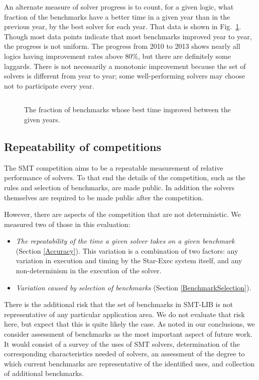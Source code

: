 \documentclass[smallcondensed]{svjour3}
\begin{document}
An alternate measure of solver progress is to count, for a given logic, what fraction of the benchmarks have a better time in a given year than in the previous year, by the best solver for each year. That data is shown in Fig.~\ref{Fig:bettertime}. Though most data points indicate that most benchmarks improved year to year, the progress is not uniform. The progress from 2010 to 2013 shows nearly all logics having improvement rates above 80\%, but there are definitely some laggards. There is not necessarily a monotonic improvement because the set of solvers is different from year to year; some well-performing solvers may choose not to participate every year.

\begin{figure}
\centering
\begin{tabular}{|l|r|rrrr|}
\hline

\hline
\end{tabular}
\caption{The fraction of benchmarks whose best time improved between the given years.}
\label{Fig:bettertime}
\end{figure}


\subsection{Repeatability of competitions}
\label{CompetitionRepeatability}

The SMT competition aims to be a repeatable measurement of relative performance of solvers. To that end the details of the competition, such as the rules and selection of benchmarks, are made public. In addition the solvers themselves are required to be made public after the competition.

However, there are aspects of the competition that are not deterministic. We measured two of those in this evaluation:
\begin{itemize}[noitemsep,nolistsep]
\item {\em The repeatability of the time a given solver takes on a given benchmark} (Section \ref{Accuracy}). This variation is a combination of two factors: any variation in execution and timing by the Star-Exec system itself, and any non-determinism in the execution of the solver.
\item {\em Variation caused by selection of benchmarks} (Section \ref{BenchmarkSelection}). \end{itemize}
 
 There is the additional risk that the set of benchmarks in SMT-LIB is not representative of any particular application area. 
We do not evaluate that risk here, but expect that this is quite likely the case.
As noted in our conclusions, we consider assessment of benchmarks as the most 
important aspect of future work. It would consist of a survey of the uses of SMT solvers, determination of the corresponding characteristics needed of solvers, an assessment of the degree to which current benchmarks are representative of the identified uses, and collection of additional benchmarks.
\end{document}
